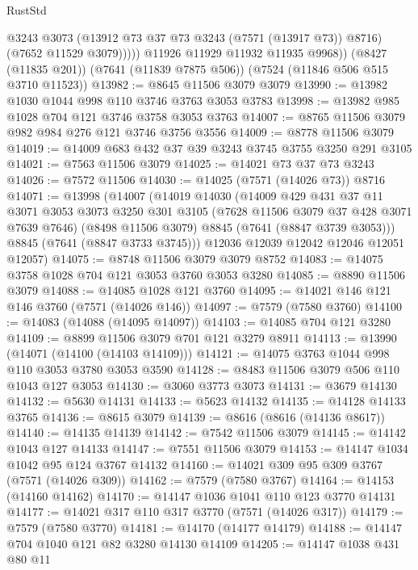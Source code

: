 \begin{lexlean}{RustStd}
\begin{coremodule}
{\begin{coremodule}
{{{{{{{{{{{{{{{{{{{{{{{{{{{{{{{{                @3243
                @3073
                (@13912 @73 @37 @73 @3243 (@7571 (@13917 @73)) @8716)
                (@7652 @11529 @3079)))))
        @11926
        @11929
        @11932
        @11935
        @9968))
    (@8427 (@11835 @201))
    (@7641 (@11839 @7875 @506))
    (@7524 (@11846 @506 @515 @3710 @11523))
@13982 := @8645 @11506 @3079 @3079
@13990 := @13982 @1030 @1044 @998 @110 @3746 @3763 @3053 @3783
@13998 := @13982 @985 @1028 @704 @121 @3746 @3758 @3053 @3763
@14007 := @8765 @11506 @3079 @982 @984 @276 @121 @3746 @3756 @3556
@14009 := @8778 @11506 @3079
@14019 := @14009 @683 @432 @37 @39 @3243 @3745 @3755 @3250 @291 @3105
@14021 := @7563 @11506 @3079
@14025 := @14021 @73 @37 @73 @3243
@14026 := @7572 @11506
@14030 := @14025 (@7571 (@14026 @73)) @8716
@14071 := @13998
    (@14007
      (@14019
        @14030
        (@14009
          @429
          @431
          @37
          @11
          @3071
          @3053
          @3073
          @3250
          @301
          @3105
          (@7628 @11506 @3079 @37 @428 @3071 @7639 @7646)
          (@8498 @11506 @3079)
          @8845
          (@7641 (@8847 @3739 @3053)))
        @8845
        (@7641 (@8847 @3733 @3745)))
      @12036
      @12039
      @12042
      @12046
      @12051
      @12057)
@14075 := @8748 @11506 @3079 @3079 @8752
@14083 := @14075 @3758 @1028 @704 @121 @3053 @3760 @3053 @3280
@14085 := @8890 @11506 @3079
@14088 := @14085 @1028 @121 @3760
@14095 := @14021 @146 @121 @146 @3760 (@7571 (@14026 @146))
@14097 := @7579 (@7580 @3760)
@14100 := @14083 (@14088 (@14095 @14097))
@14103 := @14085 @704 @121 @3280
@14109 := @8899 @11506 @3079 @701 @121 @3279 @8911
@14113 := @13990 (@14071 (@14100 (@14103 @14109)))
@14121 := @14075 @3763 @1044 @998 @110 @3053 @3780 @3053 @3590
@14128 := @8483 @11506 @3079 @506 @110 @1043 @127 @3053
@14130 := @3060 @3773 @3073
@14131 := @3679 @14130
@14132 := @5630 @14131
@14133 := @5623 @14132
@14135 := @14128 @14133 @3765
@14136 := @8615 @3079
@14139 := @8616 (@8616 (@14136 @8617))
@14140 := @14135 @14139
@14142 := @7542 @11506 @3079
@14145 := @14142 @1043 @127 @14133
@14147 := @7551 @11506 @3079
@14153 := @14147 @1034 @1042 @95 @124 @3767 @14132
@14160 := @14021 @309 @95 @309 @3767 (@7571 (@14026 @309))
@14162 := @7579 (@7580 @3767)
@14164 := @14153 (@14160 @14162)
@14170 := @14147 @1036 @1041 @110 @123 @3770 @14131
@14177 := @14021 @317 @110 @317 @3770 (@7571 (@14026 @317))
@14179 := @7579 (@7580 @3770)
@14181 := @14170 (@14177 @14179)
@14188 := @14147 @704 @1040 @121 @82 @3280 @14130 @14109
@14205 := @14147
    @1038
    @431
    @80
    @11
}}}}}}}}}}}}}}}}}}}}}}}}}}}}}}}}
\end{coremodule}}
\end{coremodule}
\end{lexlean}
